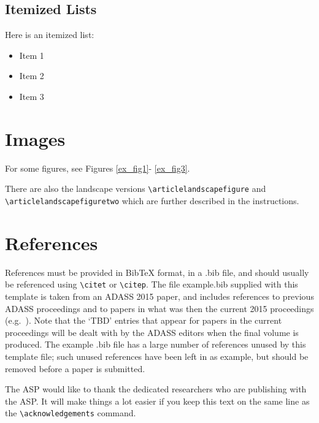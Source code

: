\documentclass[11pt,twoside]{article}
\begin{document}
\subsection{Itemized Lists}
Here is an itemized list:
\begin{itemize}
\item Item 1
\item Item 2
\item Item 3
\end{itemize}


\section{Images}
For some figures, see Figures \ref{ex_fig1}- \ref{ex_fig3}.




\clearpage %

There are also the landscape versions \verb"\articlelandscapefigure" and \\
\verb"\articlelandscapefiguretwo" which are further described in the instructions.

\section{References}
References must be provided in BibTeX format, in a .bib file, and should usually be referenced using \verb"\citet" or \verb"\citep". The file example.bib supplied with this template is taken from an ADASS 2015 paper, and includes references to previous ADASS proceedings 
\citep[such as][]{1999ASPC..172..487P} and to papers in what was then the current 2015 proceedings (e.g.\ \citet{O11-4_adassxxv}). Note that the `TBD' entries that appear for papers in the current proceedings will be dealt with by the ADASS editors when the final volume is produced. The example .bib file has a large number of references unused by this template file; such unused references have been left in as example, but should be removed before a paper is submitted.

\acknowledgements The ASP would like to thank the dedicated researchers who are publishing with the ASP.  It will make things a lot easier if you keep this text on the same line as the \verb"\acknowledgements" command.


\end{document}
